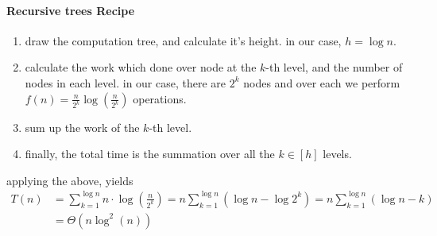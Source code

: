 \paragraph{Recursive trees Recipe}
    \begin{enumerate}
        \item draw the computation tree, and calculate it's height. in our case, \( h = \log n \).
        \item calculate the work which done over node at the \(k\)-th level, and the number of nodes in each level. in our case, there are \(2^k\) nodes and over each we perform \(f(n) = \frac{n}{2^k} \log\left( \frac{n}{2^k}\right)\) operations. 
        \item sum up the work of the \(k\)-th level.
        \item finally, the total time is the summation over all the \( k \in [h]\) levels. 
    \end{enumerate}
applying the above, yields 
\begin{equation*} 
\begin{split} 
T\left(n\right) & =  \sum_{k=1}^{\log{n}}{n\cdot\log \left( \frac{n}{2^k}\right)} = n\sum_{k=1}^{\log{n}}{ \left( \log n - \log 2^k \right) } 
  = n\sum_{k=1}^{\log{n}}{ \left( \log n - k \right) } \\
  & = \Theta \left( n \log^2 \left(n\right)  \right) 
\end{split}
\end{equation*}


